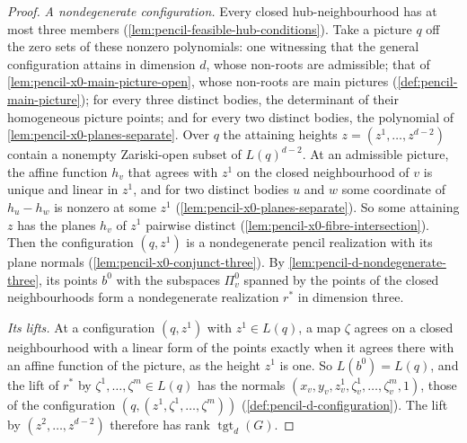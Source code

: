 \begin{proof}
  \leanok
  \emph{A nondegenerate configuration.} Every closed hub-neighbourhood has
  at most three members (\cref{lem:pencil-feasible-hub-conditions}). Take
  a picture $q$ off the zero sets of these nonzero polynomials: one
  witnessing that the general configuration attains in dimension $d$,
  whose non-roots are admissible; that of
  \cref{lem:pencil-x0-main-picture-open}, whose non-roots are main
  pictures (\cref{def:pencil-main-picture}); for every three
  distinct bodies, the determinant of their homogeneous picture points;
  and for every two distinct bodies, the polynomial of
  \cref{lem:pencil-x0-planes-separate}. Over $q$ the attaining heights
  $z = (z^1, \dots, z^{d-2})$ contain a nonempty Zariski-open subset of
  $L(q)^{d-2}$. At an admissible picture, the affine function $h_v$ that
  agrees with $z^1$ on the closed neighbourhood of $v$ is unique and
  linear in $z^1$, and for two distinct bodies $u$ and $w$ some
  coordinate of $h_u - h_w$ is nonzero at some $z^1$
  (\cref{lem:pencil-x0-planes-separate}). So some attaining $z$ has the
  planes $h_v$ of $z^1$ pairwise distinct
  (\cref{lem:pencil-x0-fibre-intersection}). Then the configuration
  $(q, z^1)$ is a nondegenerate pencil realization with its plane normals
  (\cref{lem:pencil-x0-conjunct-three}). By
  \cref{lem:pencil-d-nondegenerate-three}, its points $b^0$ with the
  subspaces $\Pi^0_v$ spanned by the points of the closed neighbourhoods
  form a nondegenerate realization $r^*$ in dimension three.

  \emph{Its lifts.} At a configuration $(q, z^1)$ with $z^1 \in L(q)$, a
  map $\zeta$ agrees on a closed neighbourhood with a linear form of the
  points exactly when it agrees there with an affine function of the
  picture, as the height $z^1$ is one. So $L(b^0) = L(q)$, and the lift
  of $r^*$ by $\zeta^1, \dots, \zeta^m \in L(q)$ has the normals
  $(x_v, y_v, z^1_v, \zeta^1_v, \dots, \zeta^m_v, 1)$, those of the
  configuration $(q, (z^1, \zeta^1, \dots, \zeta^m))$
  (\cref{def:pencil-d-configuration}). The lift by
  $(z^2, \dots, z^{d-2})$ therefore has rank $\operatorname{tgt}_d(G)$.


\end{proof}
